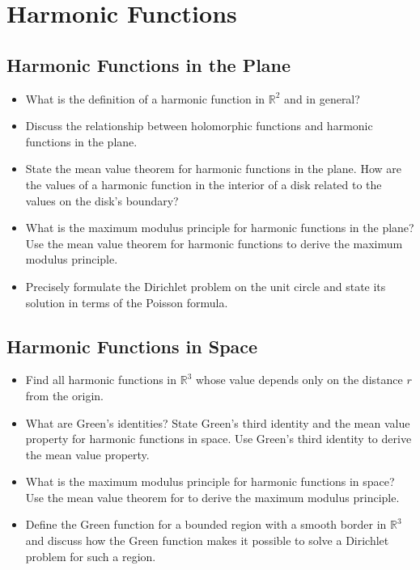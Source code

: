 \section{Harmonic Functions}

\subsection{Harmonic Functions in the Plane}

\begin{itemize}

	\item What is the definition of a harmonic function in $ \mathbb{R}^{2} $ and in general?
	
	\item Discuss the relationship between holomorphic functions and harmonic functions in the plane.
	
	\item State the mean value theorem for harmonic functions in the plane. How are the values of a harmonic function in the interior of a disk related to the values on the disk's boundary?
	
	\item What is the maximum modulus principle for harmonic functions in the plane? Use the mean value theorem for harmonic functions to derive the maximum modulus principle.
	
	
	\item Precisely formulate the Dirichlet problem on the unit circle and state its solution in terms of the Poisson formula.

\end{itemize}

\subsection{Harmonic Functions in Space}

\begin{itemize}

	\item Find all harmonic functions in $ \mathbb{R}^{3} $ whose value depends only on the distance $ r $ from the origin.
		
	\item What are Green's identities? State Green's third identity and the mean value property for harmonic functions in space. Use Green's third identity to derive the mean value property.
	
	\item What is the maximum modulus principle for harmonic functions in space? Use the mean value theorem for to derive the maximum modulus principle.
	
	\item Define the Green function for a bounded region with a smooth border in $ \mathbb{R}^{3} $ and discuss how the Green function makes it possible to solve a Dirichlet problem for such a region.
	
\end{itemize}

